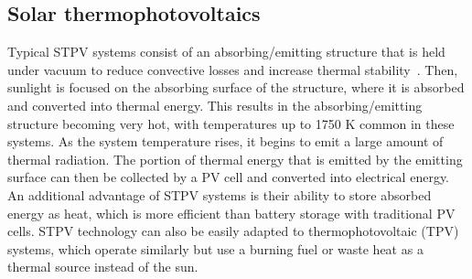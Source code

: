\documentclass[review]{elsarticle}
\begin{document}
\subsection{Solar thermophotovoltaics}
Typical STPV systems consist of an absorbing/emitting structure that is held under vacuum to reduce convective losses and increase thermal stability~\cite{global_opt, convection}.  Then, sunlight is focused on the absorbing surface of the structure, where it is absorbed and converted into thermal energy.  This results in the absorbing/emitting structure becoming very hot, with temperatures up to 1750 K common in these systems.  As the system temperature rises, it begins to emit a large amount of thermal radiation.  The portion of thermal energy that is emitted by the emitting surface can then be collected by a PV cell and converted into electrical energy.  An additional advantage of STPV systems is their ability to store absorbed energy as heat, which is more efficient than battery storage with traditional PV cells.  STPV technology can also be easily adapted to thermophotovoltaic (TPV) systems, which operate similarly but use a burning fuel or waste heat as a thermal source instead of the sun.
\end{document}
